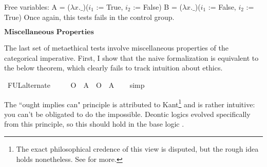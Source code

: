 \begin{isabellebody}
{  Free variables:
    A = ($\lambda x. \_$)($i_1$ := True, $i_2$ := False)
    B = ($\lambda x. \_$)($i_1$ := False, $i_2$ := True)\color{black}
Once again, this tests fails in the control group.%
}%
\endisatagproof
{\isafoldproof}%
%
\isadelimproof
%
\endisadelimproof
%
\begin{isamarkuptext}%
$\textbf{Miscellaneous Properties}$%
\end{isamarkuptext}\isamarkuptrue%
%
\begin{isamarkuptext}%
The last set of metaethical tests involve miscellaneous properties of the categorical 
imperative. First, I show that the naive formalization is equivalent to the below theorem, which clearly
fails to track intuition about ethics.%
\end{isamarkuptext}\isamarkuptrue%
\isamarkupfalse%
\ FUL{\isacharunderscore}alternate{\isacharcolon}\isanewline
\ \ \ {\isachardoublequoteopen}{\isasymTurnstile}\ {\isacharparenleft}{\isacharparenleft}{\isasymdiamond}\ {\isacharparenleft}O\ {\isacharbraceleft}\isactrlbold {\isasymnot}\ A{\isacharbraceright}{\isacharparenright}{\isacharparenright}\ \isactrlbold {\isasymrightarrow}\ {\isacharparenleft}O\ {\isacharbraceleft}\isactrlbold {\isasymnot}\ A{\isacharbraceright}{\isacharparenright}{\isacharparenright}{\isachardoublequoteclose}\isanewline
%
\isadelimproof
\ \ %
\endisadelimproof
%
\isatagproof
{}\isamarkupfalse%
\ simp\isanewline
%
\isanewline
%
%
\endisatagproof
{\isafoldproof}%
%
\isadelimproof
%
\endisadelimproof
%
\begin{isamarkuptext}%
The ``ought implies can" principle is attributed to Kant\footnote{The exact philosophical credence of this view is disputed, but the rough idea holds nonetheless. See \cite{kohl} for more.}
 and is rather intuitive: you can't be obligated to do the impossible. Deontic 
logics evolved specifically from this principle, so this should hold in the base logic \cite{cresswell}.%
\end{isamarkuptext}\isamarkuptrue%

\end{isabellebody}
